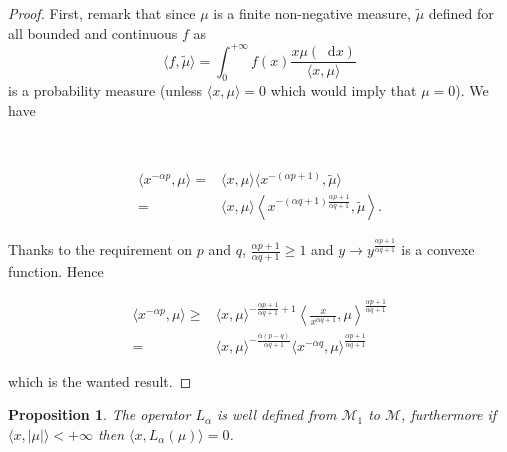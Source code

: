 \documentclass[a4paper,11pt, reqno]{amsart}
\newcommand{\cM}{\mathcal{M}}	\newcommand{\MM}{\mathbbm{M}}
\newcommand{\dd}{\mathop{}\!\mathrm{d}}
\newcommand{\1}{\mathbbm{1}}
\theoremstyle{plain}
\newtheorem{proposition}[theorem]{Proposition}
\theoremstyle{definition}
\begin{document}
\begin{proof}
  First, remark that since $\mu$ is a finite non-negative measure,
  $\tilde{\mu}$ defined for all bounded and continuous $f$ as
  \[ \langle f, \tilde{\mu} \rangle = \int_0^{+ \infty} f (x) \frac{x \mu
     (\dd x)}{\langle x, \mu \rangle} \]
  is a probability measure (unless $\langle x, \mu \rangle = 0$ which would
  imply that $\mu = 0$). We have
  
  \
  
  \begin{align*}
    \langle x^{- \alpha p}, \mu \rangle = & \langle x, \mu \rangle \langle
    x^{- (\alpha p + 1)}, \tilde{\mu} \rangle\\
    = & \langle x, \mu \rangle \left\langle x^{- (\alpha q + 1) \frac{\alpha p
    + 1}{\alpha q + 1}}, \tilde{\mu} \right\rangle .
  \end{align*}
  
  Thanks to the requirement on $p$ and $q$, $\frac{\alpha p + 1}{\alpha q + 1}
  \ge 1$ and $y \rightarrow y^{\frac{\alpha p + 1}{\alpha q + 1} }$ is a
  convexe function. Hence
  
  \begin{align*}
    \langle x^{- \alpha p}, \mu \rangle \ge & \langle x, \mu \rangle^{-
    \frac{\alpha p + 1}{\alpha q + 1} + 1} \left\langle \frac{x}{x^{\alpha q +
    1}}, \mu \right\rangle^{\frac{\alpha p + 1}{\alpha q + 1}}\\
    = & \langle x, \mu \rangle^{- \frac{\alpha (p - q)}{\alpha q + 1}} \langle
    x^{- \alpha q}, \mu \rangle^{\frac{\alpha p + 1}{\alpha q + 1}}
  \end{align*}
  
  which is the wanted result. 
\end{proof}

\begin{proposition}
  \label{prop:def-Lalpha}The operator $L_{\alpha}$ is well defined from
  $\cM_1$ to $\cM$, furthermore if $\langle x, | \mu | \rangle
  < + \infty$ then $\langle x, L_{\alpha} (\mu) \rangle = 0$.
\end{proposition}
\end{document}
